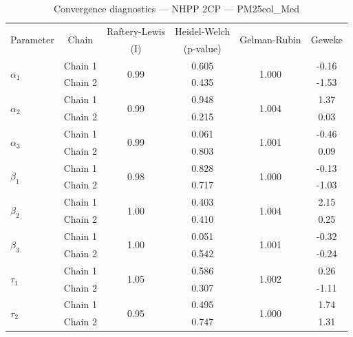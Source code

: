 \begin{table}[H]
\centering
\caption{Convergence diagnostics — NHPP 2CP — PM25col_Med}
\begin{tabular}{lccccc}
\toprule
\multirow{2}{*}{Parameter} & \multirow{2}{*}{Chain} & Raftery-Lewis & Heidel-Welch & \multirow{2}{*}{Gelman-Rubin} & \multirow{2}{*}{Geweke} \\
 & & (I) & (p-value) & & (z) \\
\midrule
\multirow{2}{*}{$\alpha_1$} & Chain 1 & \multirow{2}{*}{0.99} & 0.605 & \multirow{2}{*}{1.000} & -0.16 \\
 & Chain 2 & & 0.435 & & -1.53 \\
\multirow{2}{*}{$\alpha_2$} & Chain 1 & \multirow{2}{*}{0.99} & 0.948 & \multirow{2}{*}{1.004} & 1.37 \\
 & Chain 2 & & 0.215 & & 0.03 \\
\multirow{2}{*}{$\alpha_3$} & Chain 1 & \multirow{2}{*}{0.99} & 0.061 & \multirow{2}{*}{1.001} & -0.46 \\
 & Chain 2 & & 0.803 & & 0.09 \\
\midrule
\multirow{2}{*}{$\beta_1$} & Chain 1 & \multirow{2}{*}{0.98} & 0.828 & \multirow{2}{*}{1.000} & -0.13 \\
 & Chain 2 & & 0.717 & & -1.03 \\
\multirow{2}{*}{$\beta_2$} & Chain 1 & \multirow{2}{*}{1.00} & 0.403 & \multirow{2}{*}{1.004} & 2.15 \\
 & Chain 2 & & 0.410 & & 0.25 \\
\multirow{2}{*}{$\beta_3$} & Chain 1 & \multirow{2}{*}{1.00} & 0.051 & \multirow{2}{*}{1.001} & -0.32 \\
 & Chain 2 & & 0.542 & & -0.24 \\
\midrule
\multirow{2}{*}{$\tau_1$} & Chain 1 & \multirow{2}{*}{1.05} & 0.586 & \multirow{2}{*}{1.002} & 0.26 \\
 & Chain 2 & & 0.307 & & -1.11 \\
\multirow{2}{*}{$\tau_2$} & Chain 1 & \multirow{2}{*}{0.95} & 0.495 & \multirow{2}{*}{1.000} & 1.74 \\
 & Chain 2 & & 0.747 & & 1.31 \\
\bottomrule
\end{tabular}
\end{table}
